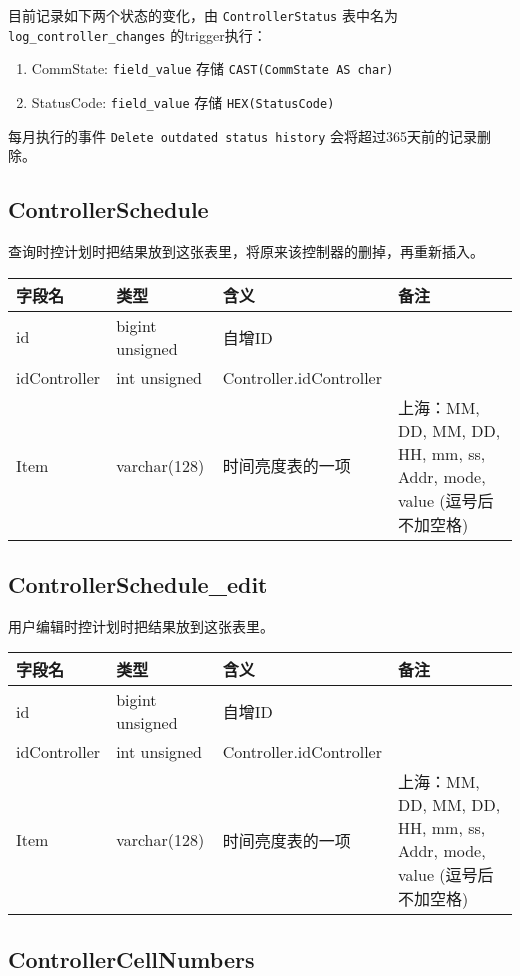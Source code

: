 目前记录如下两个状态的变化，由 \texttt{ControllerStatus} 表中名为
\texttt{log\_controller\_changes} 的trigger执行：

\begin{enumerate}
\def\labelenumi{\arabic{enumi}.}
\itemsep1pt\parskip0pt
\item
  CommState: \texttt{field\_value} 存储 \texttt{CAST(CommState AS char)}
\item
  StatusCode: \texttt{field\_value} 存储 \texttt{HEX(StatusCode)}
\end{enumerate}

每月执行的事件 \texttt{Delete outdated status history}
会将超过365天前的记录删除。

\subsection{ControllerSchedule}\label{controllerschedule}

查询时控计划时把结果放到这张表里，将原来该控制器的删掉，再重新插入。

\begin{longtabu}[c]{@{}lXXX@{}}
\toprule
字段名 & 类型 & 含义 & 备注\tabularnewline
\midrule
\endhead
id & bigint unsigned & 自增ID &\tabularnewline
idController & int unsigned & Controller.idController &\tabularnewline
Item & varchar(128) & 时间亮度表的一项 & 上海：MM, DD, MM, DD, HH, mm,
ss, Addr, mode, value (逗号后不加空格)\tabularnewline
\bottomrule
\end{longtabu}

\subsection{ControllerSchedule\_edit}\label{controllerscheduleux5fedit}

用户编辑时控计划时把结果放到这张表里。

\begin{longtabu}[c]{@{}lXXX@{}}
\toprule
字段名 & 类型 & 含义 & 备注\tabularnewline
\midrule
\endhead
id & bigint unsigned & 自增ID &\tabularnewline
idController & int unsigned & Controller.idController &\tabularnewline
Item & varchar(128) & 时间亮度表的一项 & 上海：MM, DD, MM, DD, HH, mm,
ss, Addr, mode, value (逗号后不加空格)\tabularnewline
\bottomrule
\end{longtabu}

\subsection{ControllerCellNumbers}\label{controllercellnumbers}

